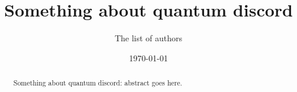 \documentclass[%
 reprint,
 amsmath,amssymb,
 aps,
]{revtex4-1}
\begin{document}

\title{Something about quantum discord}%

\author{The list of authors}




\date{\today}%

\begin{abstract}
Something about quantum discord: abstract goes here.
\end{abstract}

\maketitle
\end{document}
